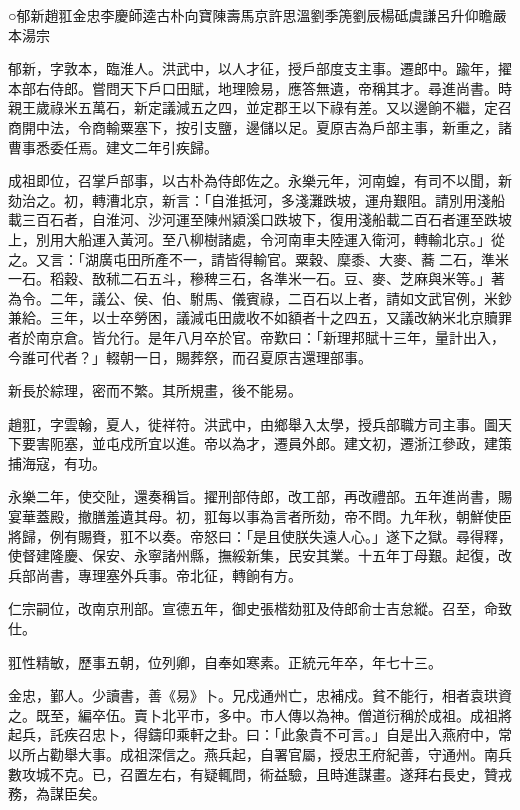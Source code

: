
\begin{pinyinscope}
○郁新趙羾金忠李慶師逵古朴向寶陳壽馬京許思溫劉季箎劉辰楊砥虞謙呂升仰瞻嚴本湯宗

郁新，字敦本，臨淮人。洪武中，以人才征，授戶部度支主事。遷郎中。踰年，擢本部右侍郎。嘗問天下戶口田賦，地理險易，應答無遺，帝稱其才。尋進尚書。時親王歲祿米五萬石，新定議減五之四，並定郡王以下祿有差。又以邊餉不繼，定召商開中法，令商輸粟塞下，按引支鹽，邊儲以足。夏原吉為戶部主事，新重之，諸曹事悉委任焉。建文二年引疾歸。

成祖即位，召掌戶部事，以古朴為侍郎佐之。永樂元年，河南蝗，有司不以聞，新劾治之。初，轉漕北京，新言：「自淮抵河，多淺灘跌坡，運舟艱阻。請別用淺船載三百石者，自淮河、沙河運至陳州潁溪口跌坡下，復用淺船載二百石者運至跌坡上，別用大船運入黃河。至八柳樹諸處，令河南車夫陸運入衛河，轉輸北京。」從之。又言：「湖廣屯田所產不一，請皆得輸官。粟穀、穈黍、大麥、蕎二石，準米一石。稻穀、敔秫二石五斗，穇稗三石，各準米一石。豆、麥、芝麻與米等。」著為令。二年，議公、侯、伯、駙馬、儀賓祿，二百石以上者，請如文武官例，米鈔兼給。三年，以士卒勞困，議減屯田歲收不如額者十之四五，又議改納米北京贖罪者於南京倉。皆允行。是年八月卒於官。帝歎曰：「新理邦賦十三年，量計出入，今誰可代者？」輟朝一日，賜葬祭，而召夏原吉還理部事。

新長於綜理，密而不繁。其所規畫，後不能易。

趙羾，字雲翰，夏人，徙祥符。洪武中，由鄉舉入太學，授兵部職方司主事。圖天下要害阨塞，並屯戍所宜以進。帝以為才，遷員外郎。建文初，遷浙江參政，建策捕海寇，有功。

永樂二年，使交阯，還奏稱旨。擢刑部侍郎，改工部，再改禮部。五年進尚書，賜宴華蓋殿，撤膳羞遺其母。初，羾每以事為言者所劾，帝不問。九年秋，朝鮮使臣將歸，例有賜賚，羾不以奏。帝怒曰：「是且使朕失遠人心。」遂下之獄。尋得釋，使督建隆慶、保安、永寧諸州縣，撫綏新集，民安其業。十五年丁母艱。起復，改兵部尚書，專理塞外兵事。帝北征，轉餉有方。

仁宗嗣位，改南京刑部。宣德五年，御史張楷劾羾及侍郎俞士吉怠縱。召至，命致仕。

羾性精敏，歷事五朝，位列卿，自奉如寒素。正統元年卒，年七十三。

金忠，鄞人。少讀書，善《易》卜。兄戍通州亡，忠補戍。貧不能行，相者袁珙資之。既至，編卒伍。賣卜北平市，多中。市人傳以為神。僧道衍稱於成祖。成祖將起兵，託疾召忠卜，得鑄印乘軒之卦。曰：「此象貴不可言。」自是出入燕府中，常以所占勸舉大事。成祖深信之。燕兵起，自署官屬，授忠王府紀善，守通州。南兵數攻城不克。已，召置左右，有疑輒問，術益驗，且時進謀畫。遂拜右長史，贊戎務，為謀臣矣。


\end{pinyinscope}

